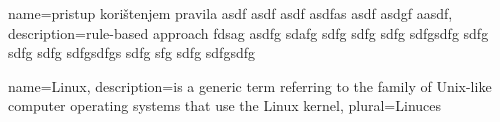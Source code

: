 
{
  name=pristup korištenjem pravila asdf asdf asdf asdfas asdf asdgf aasdf,
  description={rule-based approach fdsag asdfg sdafg sdfg sdfg sdfg sdfgsdfg sdfg sdfg sdfg sdfgsdfgs sdfg sfg sdfg sdfgsdfg}
}

{
  name=Linux,
  description={is a generic term referring to the family of Unix-like
               computer operating systems that use the Linux kernel},
  plural=Linuces
}

